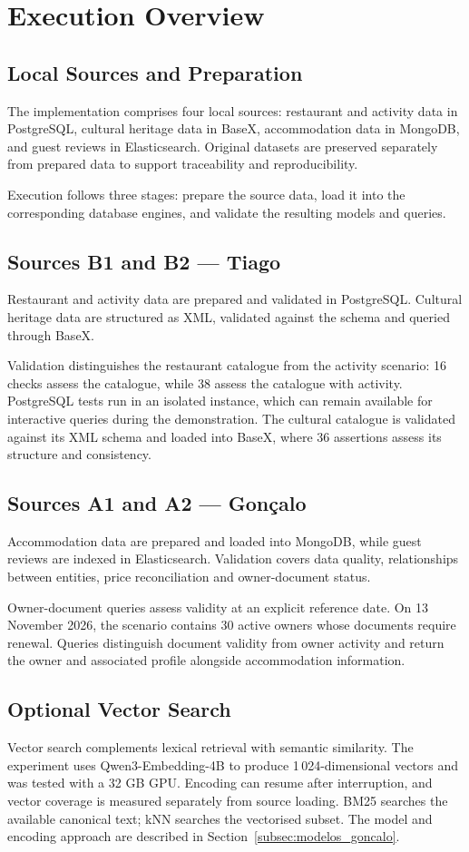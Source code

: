 \section{Execution Overview}\label{ap:execucao}
\subsection{Local Sources and Preparation}
The implementation comprises four local sources: restaurant and activity data in PostgreSQL, cultural heritage data in BaseX, accommodation data in MongoDB, and guest reviews in Elasticsearch. Original datasets are preserved separately from prepared data to support traceability and reproducibility.

Execution follows three stages: prepare the source data, load it into the corresponding database engines, and validate the resulting models and queries.

\subsection{Sources B1 and B2 --- Tiago}
Restaurant and activity data are prepared and validated in PostgreSQL. Cultural heritage data are structured as XML, validated against the schema and queried through BaseX.

Validation distinguishes the restaurant catalogue from the activity scenario: 16 checks assess the catalogue, while 38 assess the catalogue with activity. PostgreSQL tests run in an isolated instance, which can remain available for interactive queries during the demonstration. The cultural catalogue is validated against its XML schema and loaded into BaseX, where 36 assertions assess its structure and consistency.

\subsection{Sources A1 and A2 --- Gonçalo}
Accommodation data are prepared and loaded into MongoDB, while guest reviews are indexed in Elasticsearch. Validation covers data quality, relationships between entities, price reconciliation and owner-document status.

Owner-document queries assess validity at an explicit reference date. On 13 November 2026, the scenario contains 30 active owners whose documents require renewal. Queries distinguish document validity from owner activity and return the owner and associated profile alongside accommodation information.

\subsection{Optional Vector Search}
Vector search complements lexical retrieval with semantic similarity. The experiment uses Qwen3-Embedding-4B to produce 1\,024-dimensional vectors and was tested with a 32 GB GPU. Encoding can resume after interruption, and vector coverage is measured separately from source loading. BM25 searches the available canonical text; kNN searches the vectorised subset. The model and encoding approach are described in Section~\ref{subsec:modelos_goncalo}.
